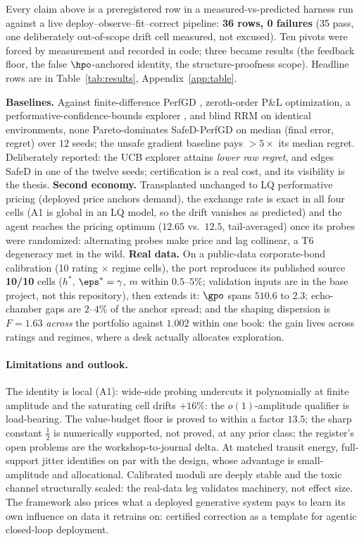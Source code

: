 \documentclass{article}
\begin{document}
Every claim above is a preregistered row in a measured-vs-predicted harness run against a live deploy--observe--fit--correct pipeline: \textbf{36 rows, 0 failures} (35 pass, one deliberately out-of-scope drift cell measured, not excused). Ten pivots were forced by measurement and recorded in code; three became results (the feedback floor, the false $\hpo$-anchored identity, the structure-proofness scope). Headline rows are in Table~\ref{tab:results}, Appendix~\ref{app:table}.



\textbf{Baselines.} Against finite-difference PerfGD \citep{izzo2021learn}, zeroth-order P\&L optimization, a performative-confidence-bounds explorer \citep{jagadeesan2022regret}, and blind RRM on identical environments, none Pareto-dominates SafeD-PerfGD on median (final error, regret) over $12$ seeds; the unsafe gradient baseline pays $>5\times$ its median regret. Deliberately reported: the UCB explorer attains \emph{lower raw regret}, and edges SafeD in one of the twelve seeds; certification is a real cost, and its visibility is the thesis. \textbf{Second economy.} Transplanted unchanged to LQ performative pricing (deployed price anchors demand), the exchange rate is exact in all four cells (A1 is global in an LQ model, so the drift vanishes as predicted) and the agent reaches the pricing optimum ($12.65$ vs.\ $12.5$, tail-averaged) once its probes were randomized: alternating probes make price and lag collinear, a T6 degeneracy met in the wild. \textbf{Real data.} On a public-data corporate-bond calibration (10 rating $\times$ regime cells), the port reproduces its published source \textbf{10/10} cells ($h^*$, $\eps^* = \gamma$, $m$ within $0.5$--$5\%$; validation inputs are in the base project, not this repository), then extends it: $\gpo$ spans $510.6$ to $2.3$; echo-chamber gaps are $2$--$4\%$ of the anchor spread; and the shaping dispersion is $F = 1.63$ \emph{across} the portfolio against $1.002$ within one book: the gain lives across ratings and regimes, where a desk actually allocates exploration.

\paragraph{Limitations and outlook.}\label{sec:limits} The identity is local (A1): wide-side probing undercuts it polynomially at finite amplitude and the saturating cell drifts $+16\%$: the $o(1)$-amplitude qualifier is load-bearing. The value-budget floor is proved to within a factor $13.5$; the sharp constant $\tfrac{1}{2}$ is numerically supported, not proved, at any prior class; the register's open problems are the workshop-to-journal delta. At matched transit energy, full-support jitter identifies on par with the design, whose advantage is small-amplitude and allocational. Calibrated moduli are deeply stable and the toxic channel structurally scaled: the real-data leg validates machinery, not effect size. The framework also prices what a deployed generative system pays to learn its own influence on data it retrains on: certified correction as a template for agentic closed-loop deployment.
\end{document}
